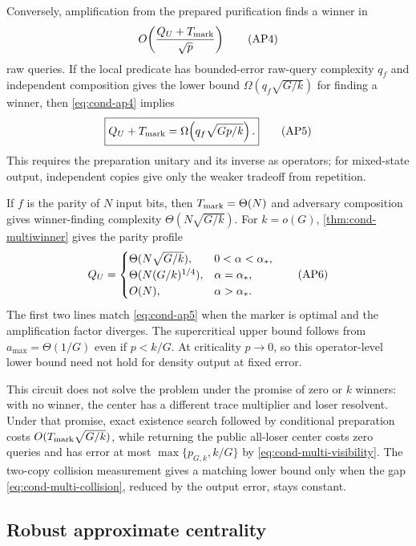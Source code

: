 Conversely, amplification from the prepared purification finds a winner in
\begin{equation*}
 O\!\left(\frac{Q_U+T_{\rm mark}}{\sqrt p}\right)          \condtag{AP4}\label{eq:cond-ap4}
\end{equation*}
raw queries.  If the local predicate has bounded-error raw-query complexity
$q_f$ and independent composition gives the lower bound
$\Omega(q_f\sqrt{G/k})$ for finding a winner, then \eqref{eq:cond-ap4}
implies
\begin{equation*}
 \boxed{Q_U+T_{\rm mark}=\Omega\!\left(q_f\sqrt{Gp/k}\right).}         \condtag{AP5}\label{eq:cond-ap5}
\end{equation*}
This requires the preparation unitary and its inverse as operators; for
mixed-state output, independent copies give only the weaker tradeoff from
repetition.

If $f$ is the parity of $N$ input bits, then $T_{\rm mark}=\Theta(N)$ and
adversary composition gives winner-finding complexity
$\Theta(N\sqrt{G/k})$.  For $k=o(G)$, \cref{thm:cond-multiwinner} gives the
parity profile
\begin{equation*}
 Q_U=\begin{cases}
 \Theta(N\sqrt{G/k}),&0<\alpha<\alpha_*,\\
 \Theta(N(G/k)^{1/4}),&\alpha=\alpha_*,\\
 O(N),&\alpha>\alpha_*.
 \end{cases}                                                \condtag{AP6}\label{eq:cond-ap6}
\end{equation*}
The first two lines match \eqref{eq:cond-ap5} when the marker is optimal and
the amplification factor diverges.  The supercritical upper bound follows
from $a_{\max}=\Theta(1/G)$ even if $p<k/G$.  At criticality $p\to0$, so
this operator-level lower bound need not hold for density output at fixed
error.

This circuit does not solve the problem under the promise of zero or $k$
winners: with no winner, the center has a different trace multiplier and
loser resolvent.  Under that promise, exact existence search followed by
conditional preparation costs $O(T_{\rm mark}\sqrt{G/k})$, while returning
the public all-loser center costs zero queries and has error at most
$\max\{p_{G,k},k/G\}$ by \eqref{eq:cond-multi-visibility}.  The two-copy
collision measurement gives a matching lower bound only when the gap
\eqref{eq:cond-multi-collision}, reduced by the output error, stays
constant.

\subsection{Robust approximate centrality}
\label{sec:condensation-robustness}

